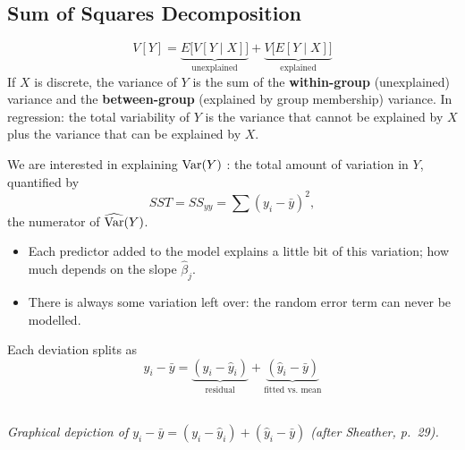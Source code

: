 \subsection{Sum of Squares Decomposition}

\begin{theorem}
    \[\boxed{V[Y]=\underbrace{E\big[V[Y\mid X]\big]}_{\text{unexplained}}+\underbrace{V\big[E[Y\mid X]\big]}_{\text{explained}}}\]
    If $X$ is discrete, the variance of $Y$ is the sum of the \textbf{within-group}
    (unexplained) variance and the \textbf{between-group} (explained by group membership)
    variance. In regression: the total variability of $Y$ is the variance that cannot be
    explained by $X$ plus the variance that can be explained by $X$.
\end{theorem}

\begin{definition}
    We are interested in explaining $\operatorname{Var}(Y)$ : the total
    amount of variation in $Y$, quantified by
    \[SST=SS_{yy}=\sum(y_i-\bar y)^2,\]
    the numerator of $\widehat{\operatorname{Var}}(Y)$.
    \begin{itemize}
        \item Each predictor added to the model explains a little bit of this variation; how
        much depends on the slope $\hat\beta_j$.
        \item There is always some variation left over: the random error term can never be modelled.
    \end{itemize}
    Each deviation splits as
    \[y_i-\bar y=\underbrace{(y_i-\hat y_i)}_{\text{residual}}+\underbrace{(\hat y_i-\bar y)}_{\text{fitted vs.\ mean}}\]
\end{definition}

\begin{center}
\\[2pt] \textit{\small Graphical depiction of $y_i-\bar y=(y_i-\hat y_i)+(\hat y_i-\bar y)$ (after Sheather, p.\ 29).}
\end{center}

